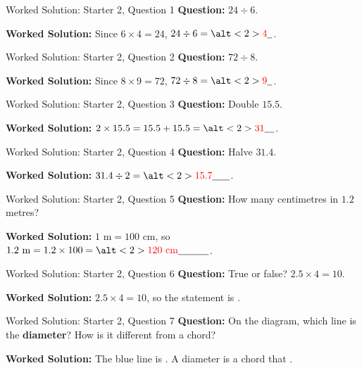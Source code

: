 \documentclass{beamer}
\newcommand{\ablank}[1]{%
  \alt<2>{\textcolor{red}{#1}}{\underline{\phantom{#1}}}%
}
\newcommand{\ashow}[1]{\uncover<2->{\textcolor{red}{\small #1}}}
\begin{document}
\begin{frame}{Worked Solution: Starter 2, Question 1}
\hypertarget{work-st2}{}
\small
\textbf{Question:} \(24\div6\).

\textbf{Worked Solution:} Since \(6\times4=24\), \(24\div6=\ablank{4}\).
\end{frame}

\begin{frame}{Worked Solution: Starter 2, Question 2}
\small
\textbf{Question:} \(72\div8\).

\textbf{Worked Solution:} Since \(8\times9=72\), \(72\div8=\ablank{9}\).
\end{frame}

\begin{frame}{Worked Solution: Starter 2, Question 3}
\small
\textbf{Question:} Double \(15.5\).

\textbf{Worked Solution:} \(2\times15.5=15.5+15.5=\ablank{31}\).
\end{frame}

\begin{frame}{Worked Solution: Starter 2, Question 4}
\small
\textbf{Question:} Halve \(31.4\).

\textbf{Worked Solution:} \(31.4\div2=\ablank{15.7}\).
\end{frame}

\begin{frame}{Worked Solution: Starter 2, Question 5}
\small
\textbf{Question:} How many centimetres in \(1.2\) metres?

\textbf{Worked Solution:} \(1\text{ m}=100\text{ cm}\), so
\(1.2\text{ m}=1.2\times100=\ablank{120\text{ cm}}\).
\end{frame}

\begin{frame}{Worked Solution: Starter 2, Question 6}
\small
\textbf{Question:} True or false? \(2.5\times4=10\).

\textbf{Worked Solution:} \(2.5\times4=10\), so the statement is \ablank{True}.
\end{frame}

\begin{frame}{Worked Solution: Starter 2, Question 7}
\small
\textbf{Question:} On the diagram, which line is the \textbf{diameter}? How is it different from a chord?

\begin{center}
\end{center}

\textbf{Worked Solution:} The blue line is \ashow{the diameter}. A diameter is a chord that \ashow{passes through the centre}.
\end{frame}
\end{document}
